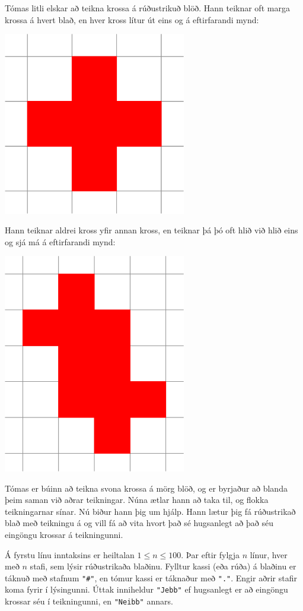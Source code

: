 
Tómas litli elskar að teikna krossa á rúðustrikuð blöð. Hann teiknar oft marga
krossa á hvert blað, en hver kross lítur út eins og á eftirfarandi mynd:

\includegraphics[width=0.6\textwidth]{cross.png}

Hann teiknar aldrei kross yfir annan kross, en teiknar þá þó oft hlið við hlið
eins og sjá má á eftirfarandi mynd:

\includegraphics[width=0.6\textwidth]{two_crosses.png}

Tómas er búinn að teikna svona krossa á mörg blöð, og er byrjaður að blanda
þeim saman við aðrar teikningar. Núna ætlar hann að taka til, og flokka
teikningarnar sínar. Nú biður hann þig um hjálp. Hann lætur þig fá rúðustrikað
blað með teikningu á og vill fá að vita hvort það sé hugsanlegt að það séu
eingöngu krossar á teikningunni.

Á fyrstu línu inntaksins er heiltalan $1 \leq n \leq 100$. Þar eftir fylgja $n$
línur, hver með $n$ stafi, sem lýsir rúðustrikaða blaðinu. Fylltur kassi (eða
rúða) á blaðinu er táknuð með stafnum \texttt{"\#"}, en tómur kassi
er táknaður með \texttt{"."}. Engir aðrir stafir koma fyrir í
lýsingunni. Úttak inniheldur \texttt{"Jebb"} ef hugsanlegt er að
eingöngu krossar séu í teikningunni, en \texttt{"Neibb"} annars.

